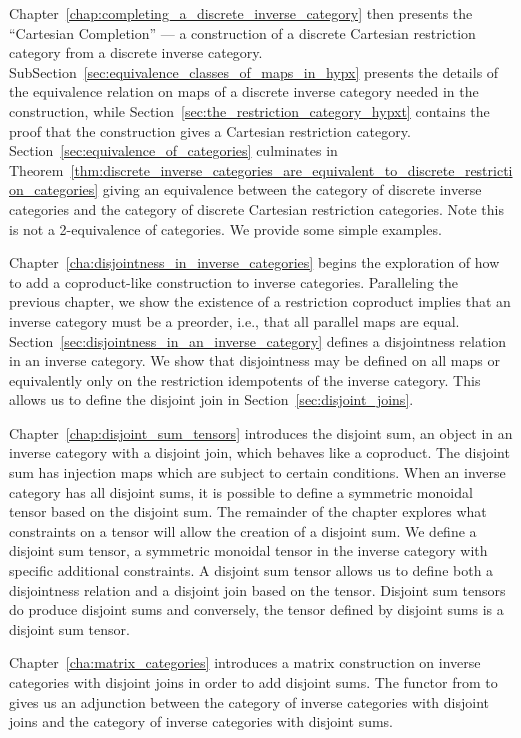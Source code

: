 Chapter~\ref{chap:completing_a_discrete_inverse_category} then presents the ``Cartesian
Completion'' --- a construction of a discrete Cartesian restriction category from a discrete
inverse category. SubSection~\ref{sec:equivalence_classes_of_maps_in_hypx} presents the details of the
equivalence relation on  maps of a discrete inverse category needed in the construction, while
Section~\ref{sec:the_restriction_category_hypxt} contains the proof that the construction gives a
Cartesian restriction category. Section~\ref{sec:equivalence_of_categories} culminates in
Theorem~\ref{thm:discrete_inverse_categories_are_equivalent_to_discrete_restriction_categories}
giving an equivalence between the category of discrete inverse categories and the
category of discrete Cartesian restriction categories. Note this is not a 2-equivalence
of categories. We provide some simple examples.


Chapter~\ref{cha:disjointness_in_inverse_categories} begins the exploration of how to add a
coproduct-like construction to inverse categories. Paralleling the previous chapter, we show the
existence of a restriction coproduct implies that an inverse category must be a preorder, i.e.,
that all parallel maps are equal. Section~\ref{sec:disjointness_in_an_inverse_category} defines a
disjointness relation in an inverse category. We show that disjointness may be defined on all maps
or equivalently only on the restriction idempotents of the inverse category. This allows us to
define the disjoint join in Section~\ref{sec:disjoint_joins}.

Chapter~\ref{chap:disjoint_sum_tensors} introduces the disjoint sum, an object in an inverse
category with a disjoint join, which behaves like a coproduct. The disjoint sum has injection maps
which are subject to certain conditions. When an inverse category has all disjoint sums, it is
possible to define a symmetric monoidal tensor based on the disjoint sum. The remainder of the
chapter explores what constraints on a tensor will allow the creation of  a disjoint sum. We define
a disjoint sum tensor, a symmetric monoidal tensor in the inverse category with specific additional
constraints. A disjoint sum tensor allows us to define both a disjointness relation and a disjoint
join based on the tensor. Disjoint sum tensors do produce disjoint sums and conversely, the tensor
defined by disjoint sums is a disjoint sum tensor.

Chapter~\ref{cha:matrix_categories} introduces a matrix construction on inverse categories with
disjoint joins in order to add disjoint sums. The functor from \X to \imatx gives us an adjunction
between the category of inverse categories with disjoint joins and the
category of inverse categories with disjoint sums.

